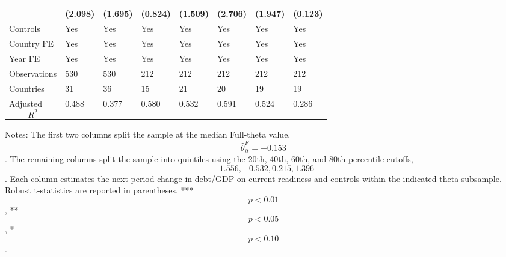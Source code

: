 \begin{table}[H]
\begin{threeparttable}
\begin{tabularx}{\textwidth}{lYYYYYYY}
  & (2.098) & (1.695) & (0.824) & (1.509) & (2.706) & (1.947) & (0.123) \\
\midrule
Controls & Yes & Yes & Yes & Yes & Yes & Yes & Yes \\
Country FE & Yes & Yes & Yes & Yes & Yes & Yes & Yes \\
Year FE & Yes & Yes & Yes & Yes & Yes & Yes & Yes \\
Observations & 530 & 530 & 212 & 212 & 212 & 212 & 212 \\
Countries & 31 & 36 & 15 & 21 & 20 & 19 & 19 \\
Adjusted $$R^2$$ & 0.488 & 0.377 & 0.580 & 0.532 & 0.591 & 0.524 & 0.286 \\
\bottomrule
\end{tabularx}
\begin{tablenotes}[flushleft]\footnotesize
\item Notes: The first two columns split the sample at the median Full-theta value, $$\widehat{\theta}^{F}_{it}=-0.153$$. The remaining columns split the sample into quintiles using the 20th, 40th, 60th, and 80th percentile cutoffs, $$-1.556, -0.532, 0.215, 1.396$$. Each column estimates the next-period change in debt/GDP on current readiness and controls within the indicated theta subsample. Robust t-statistics are reported in parentheses. *** $$p<0.01$$, ** $$p<0.05$$, * $$p<0.10$$.
\end{tablenotes}
\end{threeparttable}
\end{table}
